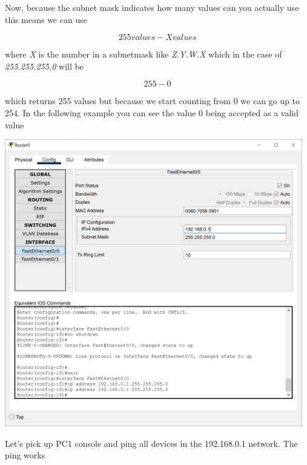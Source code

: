 \documentclass[a4paper,12pt]{article}
\begin{document}
\noindent Now, because the subnet mask indicates how many values can you actually use this means we can use

\[ 255 values - X values \]

\noindent where \emph{X} is the number in a subnetmask like \emph{Z.Y.W.X} which in the case of \emph{255.255.255.0} will be

\[ 255 - 0\]

\noindent which returns 255 values but because we start counting from 0 we can go up to 254.
In the following example you can see the value 0 being accepted as a valid value \newline 

\noindent \includegraphics[width=13cm]{./step-by-step/17.PNG}
\clearpage


\noindent Let's pick up PC1 console and ping all devices in the 192.168.0.1 network. The ping works \newline
\end{document}
